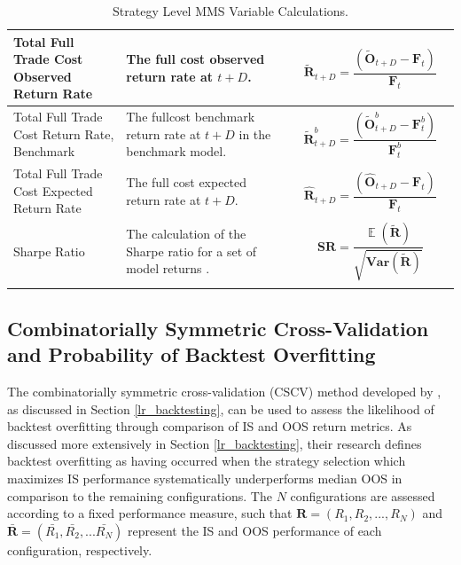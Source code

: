 \documentclass[a4paper,11pt,oneside]{article}
\newcommand{\Var}{\mathbf{Var}}
\DeclareMathOperator*{\E}{\mathbb{E}}
\theoremstyle{plain}
\theoremstyle{definition}
\begin{document}
\begin{longtable}{|p{0.25\linewidth}|p{0.375\linewidth}|p{0.375\linewidth}|}
		{Total Full Trade Cost Observed Return Rate} 
		& {The full cost observed return rate at $t+D$.}
		& {\begin{equation}
			\mathbf{\tilde{R}}_{t + D} = \frac{\left( \mathbf{\tilde{O}}_{t+D} - \mathbf{F}_t \right) }
			{\mathbf{F}_t} 
			\end{equation}
		} \\\hline
	
		{Total Full Trade Cost Return Rate, Benchmark} 
		& {The fullcost benchmark return rate at $t+D$ in the benchmark model.}
		& {\begin{equation}
			\mathbf{\tilde{R}}^b_{t + D} = \frac{\left( \mathbf{\tilde{O}}^b_{t+D} - \mathbf{F}^b_t \right) }
			{\mathbf{F}^b_t} 
			\end{equation}	
		} \\\hline
	
		{Total Full Trade Cost Expected Return Rate} 
		& {The full cost expected return rate at $t+D$.}
		& {\begin{equation}
			\mathbf{\hat{R}}_{t + D} = \frac{\left( \mathbf{\hat{O}}_{t+D} - \mathbf{F}_t \right) }
			{\mathbf{F}_t} 
			\end{equation}
		} \\\hline

		{Sharpe Ratio} 
		& {The calculation of the Sharpe ratio for a set of model returns \citep{Lo}.}
		& {\begin{equation}\label{eq_sharperatio}
			\mathbf{SR} = \frac{\mathbf{\E}(\mathbf{\tilde{R}})}{\sqrt{\Var(\mathbf{\tilde{R}})}} 
			\end{equation}
		} \\\hline
		
		\caption{Strategy Level MMS Variable Calculations.}
		\label{tab_calculated_fullstrat_variables}
	\end{longtable}
	
	\hfill\break

	\subsection{Combinatorially Symmetric Cross-Validation and Probability of Backtest Overfitting}\label{imp_cscv}
	
	The  combinatorially symmetric cross-validation (CSCV) method developed by \citet{BailyPBO}, as discussed in Section \ref{lr_backtesting}, can be used to assess the likelihood of backtest overfitting through comparison of IS and OOS return metrics. As discussed more extensively in Section \ref{lr_backtesting}, their research defines backtest overfitting as having occurred when the strategy selection which maximizes IS performance systematically underperforms median OOS in comparison to the remaining configurations. The $N$  configurations are assessed according to a fixed performance measure, such that $\mathbf{R} = (R_1, R_2, ..., R_N)$ and $\mathbf{\bar{R}} = (\bar{R_1}, \bar{R_2},... \bar{R_N})$ represent the IS and OOS performance of each configuration, respectively. \newline
	
\end{document}
